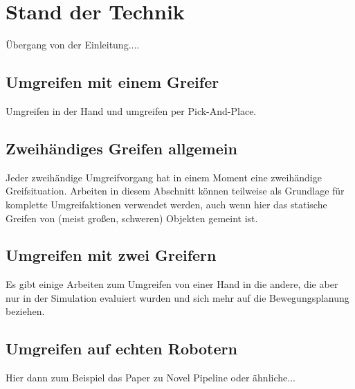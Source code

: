 \chapter{Stand der Technik}

Übergang von der Einleitung....

\section{Umgreifen mit einem Greifer}

Umgreifen in der Hand und umgreifen per Pick-And-Place.

\section{Zweihändiges Greifen allgemein}

Jeder zweihändige Umgreifvorgang hat in einem Moment eine zweihändige
Greifsituation.
Arbeiten in diesem Abschnitt können teilweise als Grundlage für komplette
Umgreifaktionen verwendet werden, auch wenn hier das statische Greifen von (meist großen, schweren) Objekten gemeint ist.

\section{Umgreifen mit zwei Greifern}

Es gibt einige Arbeiten zum Umgreifen von einer Hand in die andere, die aber
nur in der Simulation evaluiert wurden und sich mehr auf die Bewegungsplanung
beziehen.

\section{Umgreifen auf echten Robotern}

Hier dann zum Beispiel das Paper zu \glqq Novel Pipeline\grqq{} oder ähnliche...